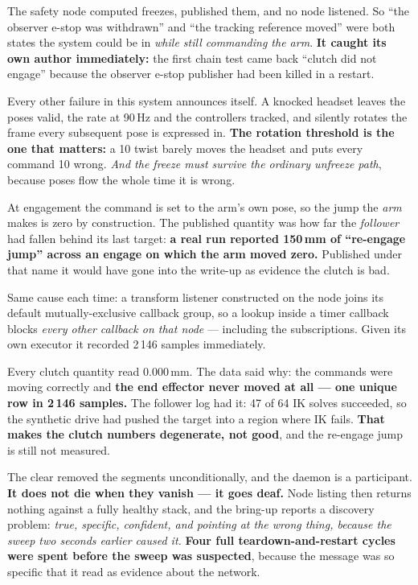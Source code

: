 {The safety node computed freezes, published them, and no node listened. So ``the
observer e-stop was withdrawn'' and ``the tracking reference moved'' were both
states the system could be in \emph{while still commanding the arm}. \textbf{It
caught its own author immediately:} the first chain test came back ``clutch did
not engage'' because the observer e-stop publisher had been killed in a restart.}

{Every other failure in this system announces itself. A knocked headset leaves
the poses valid, the rate at 90\,Hz and the controllers tracked, and silently
rotates the frame every subsequent pose is expressed in. \textbf{The rotation
threshold is the one that matters:} a 10\dg{} twist barely moves the headset and
puts every command 10\dg{} wrong. \textit{And the freeze must survive the
ordinary unfreeze path}, because poses flow the whole time it is wrong.}

{At engagement the command is set to the arm's own pose, so the jump the
\emph{arm} makes is zero by construction. The published quantity was how far the
\emph{follower} had fallen behind its last target: \textbf{a real run reported
150\,mm of ``re-engage jump'' across an engage on which the arm moved zero.}
Published under that name it would have gone into the write-up as evidence the
clutch is bad.}

{Same cause each time: a transform listener constructed on the node joins its
default mutually-exclusive callback group, so a lookup inside a timer callback
blocks \emph{every other callback on that node} --- including the subscriptions.
Given its own executor it recorded 2\,146 samples immediately.}

{Every clutch quantity read 0.000\,mm. The data said why: the commands were
moving correctly and \textbf{the end effector never moved at all --- one unique
row in 2\,146 samples.} The follower log had it: 47 of 64 IK solves succeeded,
so the synthetic drive had pushed the target into a region where IK fails.
\textbf{That makes the clutch numbers degenerate, not good}, and the re-engage
jump is still not measured.}

{The clear removed the segments unconditionally, and the daemon is a participant.
\textbf{It does not die when they vanish --- it goes deaf.} Node listing then
returns nothing against a fully healthy stack, and the bring-up reports a
discovery problem: \emph{true, specific, confident, and pointing at the wrong
thing, because the sweep two seconds earlier caused it.} \textbf{Four full
teardown-and-restart cycles were spent before the sweep was suspected}, because
the message was so specific that it read as evidence about the network.}

